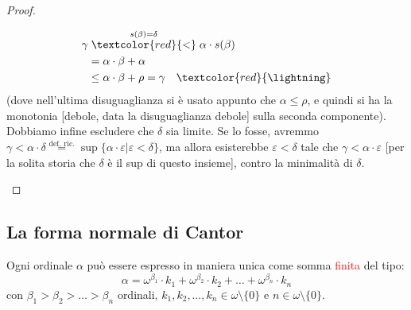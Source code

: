 \documentclass[11pt]{scrartcl}
\begin{document}
\begin{proof}
\begin{itemize}
		\[ \begin{split}
			\gamma &\;\overset{s(\beta) = \delta}{\textcolor{red}{<}}\; \alpha \cdot s(\beta) \\
									     &= \alpha \cdot \beta + \alpha \\
										 &\leq \alpha \cdot \beta + \rho = \gamma \quad \textcolor{red}{\lightning} 
		\end{split}
			\]
		(dove nell'ultima disuguaglianza si è usato appunto che $\alpha \leq \rho$, e quindi si ha la monotonia [debole, data la disuguaglianza debole] sulla seconda componente).\\
		Dobbiamo infine escludere che $\delta$ sia limite. Se lo fosse, avremmo $\gamma < \alpha \cdot \delta \overset{\text{def. ric.}}{=} \sup\{\alpha \cdot \varepsilon | \varepsilon < \delta\}$, ma 
		allora esisterebbe $\varepsilon < \delta$ tale che $\gamma < \alpha \cdot \varepsilon$ [per la solita storia che $\delta$ è il sup di questo insieme], contro la minimalità di $\delta$.
	\end{itemize}
\end{proof}

\subsection{La forma normale di Cantor}

\begin{theorem}
	Ogni ordinale $\alpha$ può essere espresso in maniera unica come somma \textcolor{red}{finita} del tipo:
	\[ \alpha = \omega^{\beta_1} \cdot k_1 + \omega^{\beta_2} \cdot k_2 + \ldots + \omega^{\beta_n} \cdot k_n
		\]
	con $\beta_1 > \beta_2 > \ldots > \beta_n$ ordinali, $k_1,k_2,\ldots,k_n \in \omega\setminus\{0\}$ e $n \in \omega\setminus\{0\}$.
\end{theorem}
\end{document}
